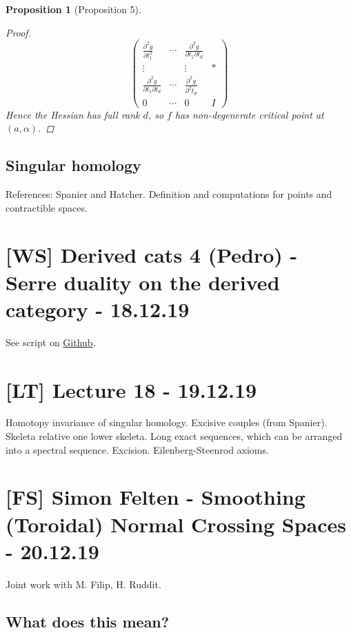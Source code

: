 \documentclass[A4paper, british, reqno]{amsart}
\theoremstyle{darkgreentheorem}
\newtheorem{prop}[thm]{Proposition}
\theoremstyle{darkbluedefinition}
\theoremstyle{darkredexample}
\theoremstyle{remark}
\newcommand{\1}{\mathbbm{1}}
\begin{document}
\begin{prop}[Proposition 5]
\begin{proof}
	\[ \begin{pmatrix} \frac{\partial^{2} g}{\partial t_{1}^{2}} & \cdots & \frac{\partial^{2}g}{\partial t_{1}\partial t_{d}} & \\
	    \vdots & & \vdots & * \\
	    \frac{\partial^{2}g}{\partial t_{1}\partial t_{d}} & \cdots & \frac{\partial^{2} g}{\partial^{2}t_{d}} & \\
	    0 & \cdots & 0 & I
	\end{pmatrix} \]
	Hence the Hessian has full rank $d$, so $f$ has non-degenerate critical point at $(a,\alpha)$.
    \end{proof}
\end{prop}

\subsection{Singular homology}

References: Spanier and Hatcher.
Definition and computations for points and contractible spaces.

\section{[WS] Derived cats 4 (Pedro) - Serre duality on the derived category - 18.12.19}

See script on \href{https://github.com/pedro-nlb/sd}{Github}.

\section{[LT] Lecture 18 - 19.12.19}

Homotopy invariance of singular homology.
Excisive couples (from Spanier).
Skeleta relative one lower skeleta.
Long exact sequences, which can be arranged into a spectral sequence.
Excision.
Eilenberg-Steenrod axioms.

\section{[FS] Simon Felten - Smoothing (Toroidal) Normal Crossing Spaces - 20.12.19}

Joint work with M. Filip, H. Ruddit.

\subsection{What does this mean?}
\end{document}
